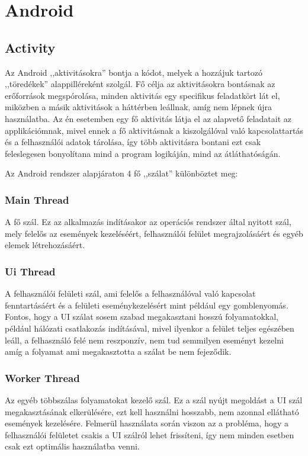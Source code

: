 \documentclass[]{thesis-ekf}
\theoremstyle{definition}
\theoremstyle{remark}
\begin{document}
\section{Android}
\subsection{Activity}
Az Android ,,aktivitásokra'' bontja a kódot, melyek a hozzájuk tartozó ,,töredékek'' alappilléreként szolgál.
Fő célja az aktivitásokra bontásnak az erőforrások megspórolása, minden aktivitás egy specifikus feladatkört lát el, 
miközben a másik aktivitások a háttérben leállnak, amíg nem lépnek újra használatba. Az én esetemben egy fő aktivitás
látja el az alapvető feladatait az applikációmnak, mivel ennek a fő aktivitásnak a kiszolgálóval való kapcsolattartás és
a felhasználói adatok tárolása, így több aktivitásra bontani ezt csak feleslegesen bonyolítana mind a program logikáján,
mind az átláthatóságán.

Az Android rendszer alapjáraton 4 fő ,,szálat'' különböztet meg:
\subsubsection{Main Thread}
A fő szál. Ez az alkalmazás indításakor az operációs rendszer által nyitott szál, mely felelős az események kezeléséért,
felhasználói felület megrajzolásáért és egyéb elemek létrehozásáért.
	
\subsubsection{Ui Thread}
A felhasználói felületi szál, ami felelős a felhasználóval való kapcsolat fenntartásáért 
és a felületi eseménykezelésért mint például egy gomblenyomás. Fontos, 
hogy a UI szálat sosem szabad megakasztani hosszú folyamatokkal, 
például hálózati csatlakozás indításával, mivel ilyenkor a felület teljes egészében leáll, 
a felhasználó felé nem reszponzív, nem tud semmilyen eseményt kezelni 
amíg a folyamat ami megakasztotta a szálat be nem fejeződik.
	
\subsubsection{Worker Thread}
Az egyéb többszálas folyamatokat kezelő szál. Ez a szál nyújt megoldást a UI szál megakasztásának elkerülésére,
ezt kell használni hosszabb, nem azonnal ellátható események kezelésére. Felmerül használata során viszon az a
probléma, hogy a felhasználói felületet csakis a UI szálról lehet frissíteni, így nem minden esetben csak ezt
optimális használatba venni. 
	
\end{document}
